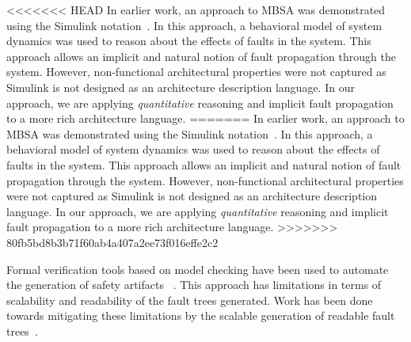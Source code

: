 <<<<<<< HEAD
In earlier work, an approach to MBSA was demonstrated using the Simulink notation~\cite{Joshi05:SafeComp,Joshi05:Dasc}. In this approach, a behavioral model of system dynamics was used to reason about the effects of faults in the system. This approach allows an implicit and natural notion of fault propagation through the system. However, non-functional architectural properties were not captured as Simulink is not designed as an architecture description language. In our approach, we are applying \textit{quantitative} reasoning and implicit fault propagation to a more rich architecture language. 
=======
In earlier work, an approach to MBSA was demonstrated using the Simulink\textsuperscript{\textregistered} notation~\cite{Joshi05:SafeComp,Joshi05:Dasc,NasaRep:MBSA-Aug05}. In this approach, a behavioral model of system dynamics was used to reason about the effects of faults in the system. This approach allows an implicit and natural notion of fault propagation through the system. However, non-functional architectural properties were not captured as Simulink is not designed as an architecture description language. In our approach, we are applying \textit{quantitative} reasoning and implicit fault propagation to a more rich architecture language. 
>>>>>>> 80fb5bd8b3b71f60ab4a407a2ee73f016effe2c2

Formal verification tools based on model checking have been used to automate the generation of safety artifacts%
~\cite{symbAltaRica,10.1007/978-3-540-75596-8-13, DBLP:conf/tacas/BittnerBCCGGMMZ16}. This approach has limitations in terms of scalability and readability of the fault trees generated. Work has been done towards mitigating these limitations by the scalable generation of readable fault trees~\cite{10.1007/978-3-319-11936-6-7}. 


